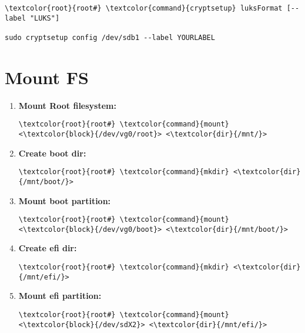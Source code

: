 \documentclass[10pt, a4paper, onecolumn, openany]{book} %
\begin{document}
\begin{Verbatim}[commandchars=\\\{\}]
\textcolor{root}{root#} \textcolor{command}{cryptsetup} luksFormat [--label "LUKS"] 

sudo cryptsetup config /dev/sdb1 --label YOURLABEL
\end{Verbatim}

\section{Mount FS}
\label{mount_fs}
\begin{enumerate}
    \item \textbf{Mount Root filesystem:}
\begin{Verbatim}[commandchars=\\\{\}]
\textcolor{root}{root#} \textcolor{command}{mount} <\textcolor{block}{/dev/vg0/root}> <\textcolor{dir}{/mnt/}>
\end{Verbatim}

    \item \textbf{Create boot dir:}
\begin{Verbatim}[commandchars=\\\{\}]
\textcolor{root}{root#} \textcolor{command}{mkdir} <\textcolor{dir}{/mnt/boot/}>
\end{Verbatim}

    \item \textbf{Mount boot partition:}
\begin{Verbatim}[commandchars=\\\{\}]
\textcolor{root}{root#} \textcolor{command}{mount} <\textcolor{block}{/dev/vg0/boot}> <\textcolor{dir}{/mnt/boot/}>
\end{Verbatim}

    \item \textbf{Create efi dir:}
\begin{Verbatim}[commandchars=\\\{\}]
\textcolor{root}{root#} \textcolor{command}{mkdir} <\textcolor{dir}{/mnt/efi/}>
\end{Verbatim}

    \item \textbf{Mount efi partition:}
\begin{Verbatim}[commandchars=\\\{\}]
\textcolor{root}{root#} \textcolor{command}{mount} <\textcolor{block}{/dev/sdX2}> <\textcolor{dir}{/mnt/efi/}>
\end{Verbatim}
\end{enumerate}
\end{document}
